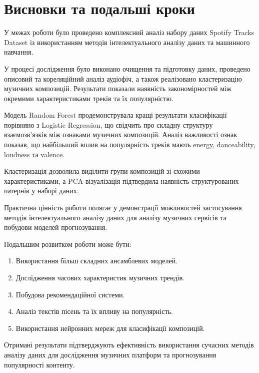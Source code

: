 \section{Висновки та подальші кроки}

У межах роботи було проведено комплексний аналіз набору даних Spotify Tracks Dataset із використанням методів інтелектуального аналізу даних та машинного навчання.

У процесі дослідження було виконано очищення та підготовку даних, проведено описовий та кореляційний аналіз аудіофіч, а також реалізовано кластеризацію музичних композицій. Результати показали наявність закономірностей між окремими характеристиками треків та їх популярністю.

Модель Random Forest продемонструвала кращі результати класифікації порівняно з Logistic Regression, що свідчить про складну структуру взаємозв'язків між ознаками музичних композицій. Аналіз важливості ознак показав, що найбільший вплив на популярність треків мають energy, danceability, loudness та valence.

Кластеризація дозволила виділити групи композицій зі схожими характеристиками, а PCA-візуалізація підтвердила наявність структурованих патернів у наборі даних.

Практична цінність роботи полягає у демонстрації можливостей застосування методів інтелектуального аналізу даних для аналізу музичних сервісів та побудови моделей прогнозування.

Подальшим розвитком роботи може бути:
\begin{enumerate}
  \item Використання більш складних ансамблевих моделей.
  \item Дослідження часових характеристик музичних трендів.
  \item Побудова рекомендаційної системи.
  \item Аналіз текстів пісень та їх впливу на популярність.
  \item Використання нейронних мереж для класифікації композицій.
\end{enumerate}

Отримані результати підтверджують ефективність використання сучасних методів аналізу даних для дослідження музичних платформ та прогнозування популярності контенту.
